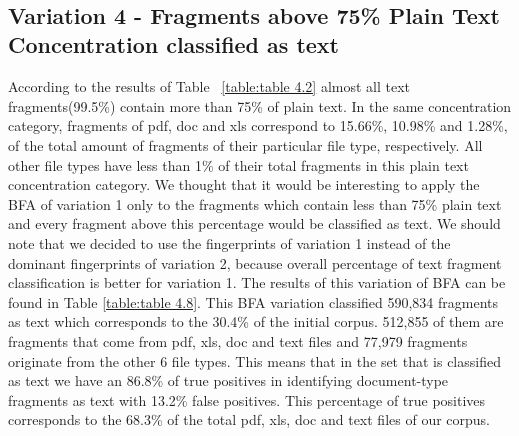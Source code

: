 ~\\


\subsection{Variation 4 - Fragments above 75\% Plain Text Concentration classified as text} 
According to the results of Table  ~\ref{table:table 4.2} almost all text fragments(99.5\%) contain more than 75\% of plain text. In the same concentration category, fragments of pdf, doc and xls correspond to 15.66\%, 10.98\% and 1.28\%, of the total amount of fragments of their particular file type, respectively. All other file types have less than 1\% of their total fragments in this plain text concentration category. We thought that it would be interesting to apply the BFA of variation 1 only to the fragments which contain less than 75\% plain text and every fragment above this percentage would be classified as text. We should note that we decided to use the fingerprints of variation 1 instead of the dominant fingerprints of variation 2, because overall percentage of text fragment classification is better for variation 1. 
The results of this variation of BFA can be found in Table \ref{table:table 4.8}.
This BFA variation classified 590,834 fragments as text which corresponds to the 30.4\% of the initial corpus. 512,855 of them are fragments that come from pdf, xls, doc and text files and 77,979 fragments originate from the other 6 file types. This means that in the set that is classified as text we have an 86.8\% of true positives in identifying document-type fragments as text with 13.2\% false positives. This percentage of true positives corresponds to the 68.3\% of the total pdf, xls, doc and text files of our corpus.
  
  
